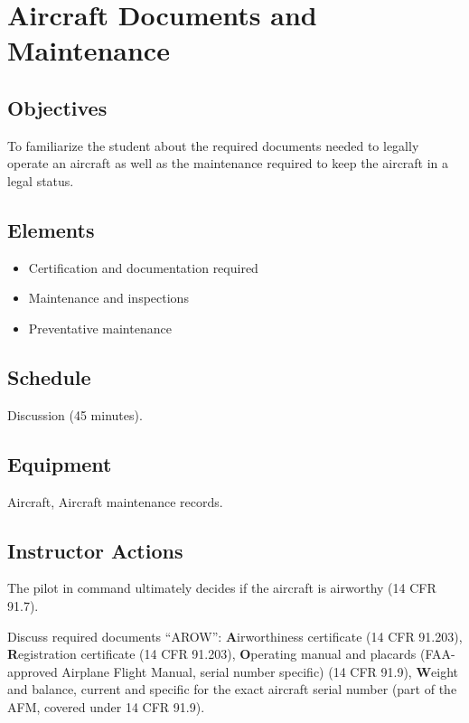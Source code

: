 \section{Aircraft Documents and Maintenance}

\subsection{Objectives}

To familiarize the student about the required documents needed to legally
operate an aircraft as well as the maintenance required to keep the aircraft in
a legal status.

\subsection{Elements}

\begin{itemize}
  \item Certification and documentation required
  \item Maintenance and inspections
  \item Preventative maintenance
\end{itemize}

\subsection{Schedule}

Discussion (45 minutes).

\subsection{Equipment}

Aircraft, Aircraft maintenance records.

\subsection{Instructor Actions}

The pilot in command ultimately decides if the aircraft is airworthy (14 CFR
91.7).

Discuss required documents ``AROW'': \textbf{A}irworthiness certificate (14 CFR
91.203), \textbf{R}egistration certificate (14 CFR 91.203), \textbf{O}perating
manual and placards (FAA-approved Airplane Flight Manual, serial number
specific) (14 CFR 91.9), \textbf{W}eight and balance, current and specific for
the exact aircraft serial number (part of the AFM, covered under 14 CFR 91.9).

